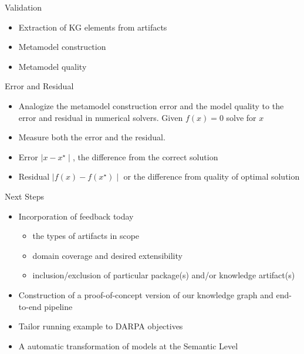 \documentclass[ignorenonframetext,]{beamer}
\providecommand{\tightlist}{%
  \setlength{\itemsep}{0pt}\setlength{\parskip}{0pt}}
\begin{document}
\begin{frame}{Validation}
\protect\hypertarget{validation}{}

\begin{itemize}
\tightlist
\item
  Extraction of KG elements from artifacts
\item
  Metamodel construction
\item
  Metamodel quality
\end{itemize}

\begin{block}{Error and Residual}

\begin{itemize}
\item
  Analogize the metamodel construction error and the model quality to
  the error and residual in numerical solvers. Given \(f(x)=0\) solve
  for \(x\)
\item
  Measure both the error and the residual.
\item
  Error \(\mid x-x^\star\mid\), the difference from the correct solution
\item
  Residual \(\mid f(x) - f(x^\star)\mid\) or the difference from quality
  of optimal solution
\end{itemize}

\end{block}

\end{frame}

\begin{frame}{Next Steps}
\protect\hypertarget{next-steps}{}

\begin{itemize}
\tightlist
\item
  Incorporation of feedback today

  \begin{itemize}
  \tightlist
  \item
    the types of artifacts in scope
  \item
    domain coverage and desired extensibility
  \item
    inclusion/exclusion of particular package(s) and/or knowledge
    artifact(s)
  \end{itemize}
\item
  Construction of a proof-of-concept version of our knowledge graph and
  end-to-end pipeline
\item
  Tailor running example to DARPA objectives
\item
  A automatic transformation of models at the Semantic Level
\end{itemize}

\end{frame}
\end{document}
